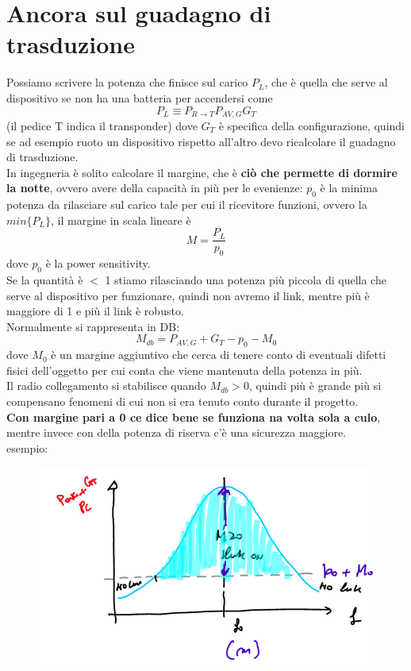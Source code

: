 \documentclass[oneside, 12pt]{extbook}
\begin{document}
\section{Ancora sul guadagno di trasduzione}
Possiamo scrivere la potenza che finisce sul carico $P_L$, che è quella che serve al dispositivo se non ha una batteria per accendersi come 
\begin{equation}
	P_L \equiv P_{R\rightarrow T} P_{AV,G} G_T	
\end{equation}
(il pedice T indica il transponder) dove $G_T$ è specifica della configurazione, quindi se ad esempio ruoto un dispositivo rispetto all'altro devo ricalcolare il guadagno di trasduzione.\\In ingegneria è solito calcolare il margine, che è \textsf{\textbf{ciò che permette di dormire la notte}}, ovvero avere della capacità in più per le evenienze: $p_0$ è la minima potenza da rilasciare sul carico tale per cui il ricevitore funzioni, ovvero la $min\{P_L\}$, il margine in scala lineare è 
\begin{equation}
	M = \frac{P_L}{p_0}	
\end{equation}
dove $p_0$ è la power sensitivity.\\Se la quantità è $<$ 1 stiamo rilasciando una potenza più piccola di quella che serve al dispositivo per funzionare, quindi non avremo il link, mentre più è maggiore di 1 e più il link è robusto.\\Normalmente si rappresenta in DB: 
\begin{equation}
	M_{db} = P_{AV,G} + G_T -p_0 - M_0	
\end{equation}
dove $M_0$ è un margine aggiuntivo che cerca di tenere conto di eventuali difetti fisici dell'oggetto per cui conta che viene mantenuta della potenza in più.\\Il radio collegamento si stabilisce quando $M_{db} > 0$, quindi più è grande più si compensano fenomeni di cui non si era tenuto conto durante il progetto.\\\textbf{Con margine pari a 0 ce dice bene se funziona na volta sola a culo}, mentre invece con della potenza di riserva c'è una sicurezza maggiore.\\esempio:\\ 
\begin{figure}[!h]
	\includegraphics[scale=0.5]{immagini/margine_sens.png}
\end{figure}\\\\
\end{document}
